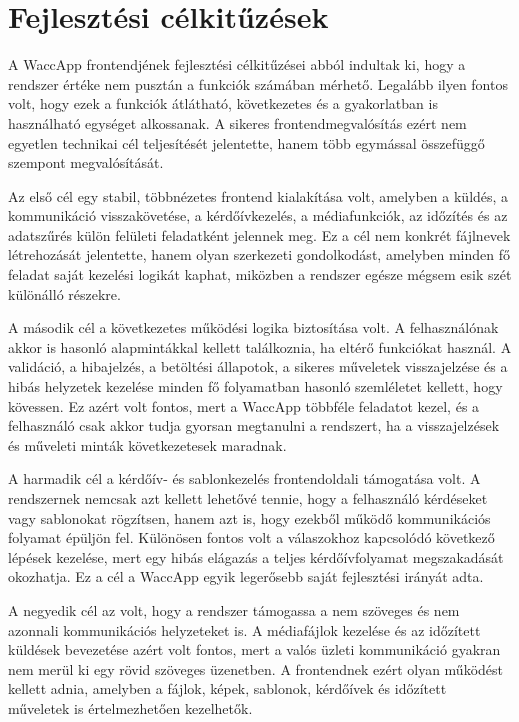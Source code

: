 \section{Fejlesztési célkitűzések}

A WaccApp frontendjének fejlesztési célkitűzései abból indultak ki, hogy a rendszer értéke nem pusztán a funkciók számában mérhető. Legalább ilyen fontos volt, hogy ezek a funkciók átlátható, következetes és a gyakorlatban is használható egységet alkossanak. A sikeres frontendmegvalósítás ezért nem egyetlen technikai cél teljesítését jelentette, hanem több egymással összefüggő szempont megvalósítását.

Az első cél egy stabil, többnézetes frontend kialakítása volt, amelyben a küldés, a kommunikáció visszakövetése, a kérdőívkezelés, a médiafunkciók, az időzítés és az adatszűrés külön felületi feladatként jelennek meg. Ez a cél nem konkrét fájlnevek létrehozását jelentette, hanem olyan szerkezeti gondolkodást, amelyben minden fő feladat saját kezelési logikát kaphat, miközben a rendszer egésze mégsem esik szét különálló részekre.

A második cél a következetes működési logika biztosítása volt. A felhasználónak akkor is hasonló alapmintákkal kellett találkoznia, ha eltérő funkciókat használ. A validáció, a hibajelzés, a betöltési állapotok, a sikeres műveletek visszajelzése és a hibás helyzetek kezelése minden fő folyamatban hasonló szemléletet kellett, hogy kövessen. Ez azért volt fontos, mert a WaccApp többféle feladatot kezel, és a felhasználó csak akkor tudja gyorsan megtanulni a rendszert, ha a visszajelzések és műveleti minták következetesek maradnak.

A harmadik cél a kérdőív- és sablonkezelés frontendoldali támogatása volt. A rendszernek nemcsak azt kellett lehetővé tennie, hogy a felhasználó kérdéseket vagy sablonokat rögzítsen, hanem azt is, hogy ezekből működő kommunikációs folyamat épüljön fel. Különösen fontos volt a válaszokhoz kapcsolódó következő lépések kezelése, mert egy hibás elágazás a teljes kérdőívfolyamat megszakadását okozhatja. Ez a cél a WaccApp egyik legerősebb saját fejlesztési irányát adta.

A negyedik cél az volt, hogy a rendszer támogassa a nem szöveges és nem azonnali kommunikációs helyzeteket is. A médiafájlok kezelése és az időzített küldések bevezetése azért volt fontos, mert a valós üzleti kommunikáció gyakran nem merül ki egy rövid szöveges üzenetben. A frontendnek ezért olyan működést kellett adnia, amelyben a fájlok, képek, sablonok, kérdőívek és időzített műveletek is értelmezhetően kezelhetők.

